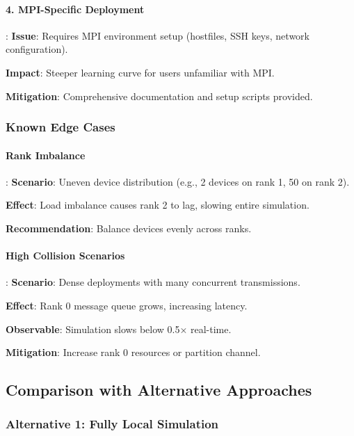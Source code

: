 \paragraph{4. MPI-Specific Deployment}:
\textbf{Issue}: Requires MPI environment setup (hostfiles, SSH keys, network configuration).

\textbf{Impact}: Steeper learning curve for users unfamiliar with MPI.

\textbf{Mitigation}: Comprehensive documentation and setup scripts provided.

\subsubsection{Known Edge Cases}

\paragraph{Rank Imbalance}:
\textbf{Scenario}: Uneven device distribution (e.g., 2 devices on rank 1, 50 on rank 2).

\textbf{Effect}: Load imbalance causes rank 2 to lag, slowing entire simulation.

\textbf{Recommendation}: Balance devices evenly across ranks.

\paragraph{High Collision Scenarios}:
\textbf{Scenario}: Dense deployments with many concurrent transmissions.

\textbf{Effect}: Rank 0 message queue grows, increasing latency.

\textbf{Observable}: Simulation slows below 0.5× real-time.

\textbf{Mitigation}: Increase rank 0 resources or partition channel.

\subsection{Comparison with Alternative Approaches}

\subsubsection{Alternative 1: Fully Local Simulation}

